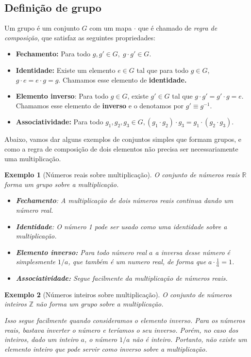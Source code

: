 \documentclass{article}
\newtheorem{example}{Exemplo}[section]
\numberwithin{equation}{section}
\numberwithin{figure}{section}
\begin{document}
\subsection{Definição de grupo}
Um grupo é um conjunto $G$ com um mapa $\cdot$ que é chamado de \textit{regra de composição}, que satisfaz as seguintes propriedades:  
\begin{itemize}
	\item \textbf{Fechamento:} Para todo $g,g'\in G,\; g\cdot g'\in G.$ 
	\item \textbf{Identidade:} Existe um elemento $e\in G$ tal que para todo $g\in G$, $g\cdot e=e\cdot g = g$. Chamamos esse elemento de \textbf{identidade. }
	\item \textbf{Elemento inverso}: Para todo $g\in G$, existe $g'\in G$ tal que $g\cdot g'=g'\cdot g = e$. Chamamos esse elemento de\textbf{ inverso} e o denotamos por $g'\equiv g^{-1}$. 
	\item \textbf{Associatividade:} Para todo $g_1,g_2,g_3\in G,(g_1\cdot g_2)\cdot g_3=g_1\cdot(g_2\cdot g_3).$
\end{itemize}
Abaixo, vamos dar alguns exemplos de conjuntos simples que formam grupos, e como a regra de composição de dois elementos não precisa ser necessariamente uma multiplicação. 
\begin{example}[Números reais sobre multiplicação]
	O conjunto de números reais $\mathbb{R}$ forma um grupo sobre a multiplicação. 
	\begin{itemize}
		\item \textbf{Fechamento}: A multiplicação de dois números reais continua dando um número real. 
		\item  \textbf{Identidade}: O número 1 pode ser usado como uma identidade sobre a multiplicação. 
		\item \textbf{Elemento inverso:} Para todo número real $a$ a inversa desse número é simplesmente $1/a$, que também é um numero real, de forma que $a\cdot\frac{1}{a}=1$. 
		\item \textbf{Associatividade:} Segue facilmente da multiplicação de números reais.
	\end{itemize}
\end{example}
\begin{example}[Números inteiros sobre multiplicação]
O conjunto de números inteiros $\mathbb{Z}$ não forma um grupo sobre a multiplicação.

Isso segue facilmente quando consideramos o elemento inverso. Para os números reais, bastava inverter o número e teríamos o seu inverso. Porém, no caso dos inteiros, dado um inteiro $a$, o número $1/a$ não é inteiro. Portanto, não existe um elemento inteiro que pode servir como inverso sobre a multiplicação.
\end{example}
\end{document}
